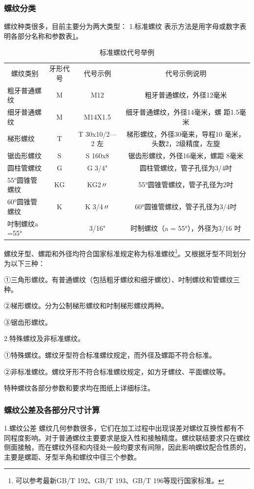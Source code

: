 \documentclass{ctexbook}
\begin{document}
\subsubsection{螺纹分类}
螺纹种类很多，目前主要分为两大类型：
1.标准螺纹 表示方法是用字母或数字表明各部分名称和参数表\ref{tab:biaozhunluowen}。
\begin{table}[htbp]
	\centering
	\caption{标准螺纹代号举例}
	\begin{tabular}{lccc}
		\multicolumn{1}{c}{螺纹类别} & 牙形代号  & 代号示例  & 代号示例说明 \\
		粗牙普通螺纹 & M     & M12   & 粗牙普通螺纹，外径12毫米 \\
		细牙普通螺纹 & M     & M14X1.5 & 细牙普通螺纹，外径14毫米，螺 距1.5毫米 \\
		梯形螺纹  & T     & T 30x10/2—2 左 & 梯形螺纹，外径30毫来，导程10 毫米，头数2，2级精度，左旋 \\
		锯齿形螺纹 & S     & S 160x8 & 锯齿形螺纹，外径16毫米，螺距 8毫米 \\
		圆柱管螺纹 & G     & G 3/4" & 圆柱管螺纹，管子孔径为3/4吋 \\
		55°圆锥管螺纹 & KG    & KG2〃  & 55°圆锥管螺纹，管子孔径为2吋 \\
		60°圆锥管螺纹 & K     & K 3/4〃 & 60°圆锥管螺纹，管子孔径为3/4吋 \\
		吋制螺纹a =55° &       & 3/16" & 时制螺纹（a = 55°），外径为3/16 吋 \\
	\end{tabular}%
	\label{tab:biaozhunluowen}%
\end{table}%
螺纹牙型、螺距和外径均符合国家标准规定称为标准螺纹\footnote{可以参考最新GB/T 192、GB/T 193、GB/T 196等现行国家标准。}。又根据牙型不同划分为以下三种：

①三角形螺纹。有普通螺纹（包括粗牙螺纹和细牙螺纹）、吋制螺纹和管螺纹三种。

②梯形螺纹。分为公制梯形螺纹和吋制梯形螺纹两种。

③锯齿形螺纹。

2.特殊螺纹及非标准螺纹。

①特殊螺纹。螺纹牙型符合标准螺纹规定，而外径及螺距不符合标准。

②非标准螺纹。螺纹牙形不符合标准螺纹规定，如方牙螺纹、平面螺纹等。

特种螺纹各部分参数和要求均在图纸上详细标注。
\subsubsection{螺纹公差及各部分尺寸计算}
1.螺纹公差
螺纹几何参数很多，它们在加工过程中出现误差对螺纹互换性都有不同程度影响。对于普通螺纹主要要求是旋入性和接触精度。螺纹联结要求只在螺纹侧面接触，而在螺纹外径和内径处一般均要求有间隙，因此影响螺纹配合性质的，主要是螺距、牙型半角和螺纹中径三个参数。
\end{document}
